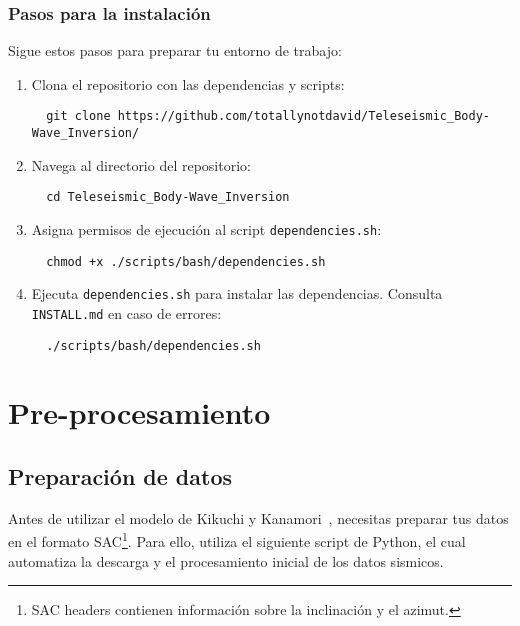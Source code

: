 \documentclass[a4paper,11pt]{refart}
\begin{document}
\subsubsection{Pasos para la instalación}

Sigue estos pasos para preparar tu entorno de trabajo:

\begin{enumerate}
  \item Clona el repositorio con las dependencias y scripts:
  \begin{verbatim}
  git clone https://github.com/totallynotdavid/Teleseismic_Body-Wave_Inversion/
  \end{verbatim}

  \item Navega al directorio del repositorio:
  \begin{verbatim}
  cd Teleseismic_Body-Wave_Inversion
  \end{verbatim}

  \item Asigna permisos de ejecución al script \texttt{dependencies.sh}:
  \begin{verbatim}
  chmod +x ./scripts/bash/dependencies.sh
  \end{verbatim}

  \item Ejecuta \texttt{dependencies.sh} para instalar las dependencias. Consulta \texttt{INSTALL.md} en caso de errores:
  \begin{verbatim}
  ./scripts/bash/dependencies.sh
  \end{verbatim}
\end{enumerate}

\section{Pre-procesamiento}

\subsection{Preparación de datos}

Antes de utilizar el modelo de Kikuchi y Kanamori~\cite{Kik2003}, necesitas preparar tus datos en el formato SAC\footnote{SAC headers contienen información sobre la inclinación y el azimut.}. Para ello, utiliza el siguiente script de Python, el cual automatiza la descarga y el procesamiento inicial de los datos sismicos.
\end{document}
